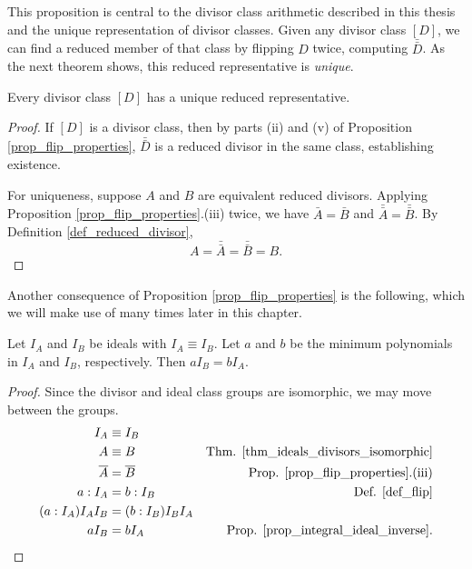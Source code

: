 This proposition is central to the divisor class arithmetic described in this thesis
and the unique representation of divisor classes.
Given any divisor class $[D]$, we can find a reduced member of that class by
flipping $D$ twice, computing $\bar{\bar D}$. As the next theorem shows,
this reduced representative is \emph{unique}.

\begin{theorem}
  Every divisor class $[D]$ has a unique reduced representative.
\end{theorem}
\begin{proof}
  If $[D]$ is a divisor class, then by parts (ii) and (v) of Proposition \ref{prop_flip_properties},
  $\bar{\bar D}$ is a reduced divisor in the same class,
  establishing existence.
  
  For uniqueness, suppose $A$ and $B$ are equivalent reduced divisors.
  Applying Proposition \ref{prop_flip_properties}.(iii) twice,
  we have $\bar A = \bar B$ and $\bar{\bar A} = \bar{\bar B}$.
  By Definition \ref{def_reduced_divisor},
    \[ A = \bar{\bar A} = \bar{\bar B} = B. \]
\end{proof}

Another consequence of Proposition \ref{prop_flip_properties} is the following,
which we will make use of many times later in this chapter.
\begin{proposition}
  \label{prop_aI_B_is_bI_A}
  Let $I_A$ and $I_B$ be ideals with $I_A \equiv I_B$.
  Let $a$ and $b$ be the minimum polynomials in $I_A$ and $I_B$, respectively.
  Then $aI_B = bI_A$.
\end{proposition}
\begin{proof}
  Since the divisor and ideal class groups are isomorphic,
  we may move between the groups.
  \begin{align*}
    I_A &\equiv I_B \\
    A &\equiv B
      & \text{Thm. \ref{thm_ideals_divisors_isomorphic}} \\
    \bar A &= \bar B
      & \text{Prop. \ref{prop_flip_properties}.(iii)} \\
    a : I_A &= b : I_B
      & \text{Def. \ref{def_flip}} \\
    (a : I_A)I_AI_B &= (b : I_B)I_BI_A \\
    aI_B &= bI_A
      & \text{Prop. \ref{prop_integral_ideal_inverse}.}
  \end{align*}
\end{proof}

